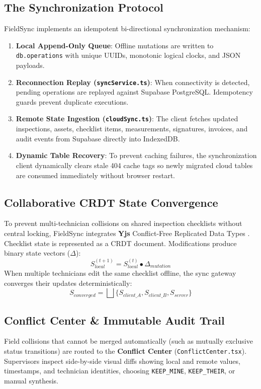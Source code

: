 \documentclass[conference]{IEEEtran}
\begin{document}
\subsection{The Synchronization Protocol}
FieldSync implements an idempotent bi-directional synchronization mechanism:
\begin{enumerate}\setlength{\itemsep}{1pt}
    \item \textbf{Local Append-Only Queue}: Offline mutations are written to \texttt{db.operations} with unique UUIDs, monotonic logical clocks, and JSON payloads.
    \item \textbf{Reconnection Replay (\texttt{syncService.ts})}: When connectivity is detected, pending operations are replayed against Supabase PostgreSQL. Idempotency guards prevent duplicate executions.
    \item \textbf{Remote State Ingestion (\texttt{cloudSync.ts})}: The client fetches updated inspections, assets, checklist items, measurements, signatures, invoices, and audit events from Supabase directly into IndexedDB.
    \item \textbf{Dynamic Table Recovery}: To prevent caching failures, the synchronization client dynamically clears stale 404 cache tags so newly migrated cloud tables are consumed immediately without browser restart.
\end{enumerate}

\subsection{Collaborative CRDT State Convergence}
To prevent multi-technician collisions on shared inspection checklists without central locking, FieldSync integrates \textbf{Yjs} Conflict-Free Replicated Data Types \cite{nicolas2020yjs, baquero2014pure}. Checklist state is represented as a CRDT document. Modifications produce binary state vectors ($\Delta$):
\begin{equation}
S_{local}^{(t+1)} = S_{local}^{(t)} \bullet \Delta_{mutation}
\end{equation}
When multiple technicians edit the same checklist offline, the sync gateway converges their updates deterministically:
\begin{equation}
S_{converged} = \bigsqcup \{S_{client\_A}, S_{client\_B}, S_{server}\}
\end{equation}

\subsection{Conflict Center \& Immutable Audit Trail}
Field collisions that cannot be merged automatically (such as mutually exclusive status transitions) are routed to the \textbf{Conflict Center} (\texttt{ConflictCenter.tsx}). Supervisors inspect side-by-side visual diffs showing local and remote values, timestamps, and technician identities, choosing \texttt{KEEP\_MINE}, \texttt{KEEP\_THEIR}, or manual synthesis.
\end{document}
